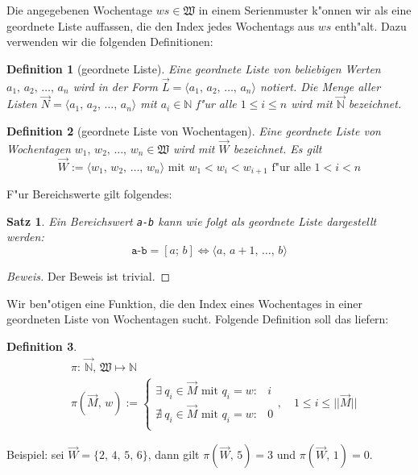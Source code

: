 \documentclass[a4paper]{article}
\newcommand*{\wkdays}{\mathfrak{W}}
\numberwithin{equation}{section}
\newtheorem{dfn}{Definition}
\newtheorem{thm}{Satz}
\begin{document}
\noindent Die angegebenen Wochentage $ws \in \wkdays$ in einem Serienmuster
k"onnen wir als eine geordnete Liste auf\mbox{}fassen, die den Index jedes
Wochentags aus $ws$ enth"alt. Dazu verwenden wir die folgenden Definitionen:
\begin{dfn}[geordnete Liste]
  Eine geordnete Liste von beliebigen Werten $a_1,\,a_2,\,\dots,\,a_n$ wird in
  der Form $\vec{L} = \langle a_1,\,a_2,\,\dots,\,a_n\rangle$ notiert. Die Menge
  aller Listen $\vec{N} = \langle a_1,\,a_2,\,\dots,\,a_n\rangle$ mit
  $a_i \in \mathbb{N}$ f"ur alle $1 \le i \le n$ wird mit $\vec{\mathbb{N}}$
  bezeichnet.
\end{dfn}
\begin{dfn}[geordnete Liste von Wochentagen]
  Eine geordnete Liste von Wochentagen $w_1,\,w_2,\,\ldots,\,w_n \in \wkdays$
  wird mit $\vec{W}$ bezeichnet. Es gilt
  \begin{equation}
    \vec{W} := \langle w_1,\,w_2,\,\dots,\,w_n\rangle\textrm{ mit }
    w_1 < w_i < w_{i+1} \textrm{ f"ur alle } 1 < i < n
  \end{equation}
\end{dfn}

\noindent F"ur Bereichswerte gilt folgendes:
\begin{thm}\label{thm:range}
  Ein Bereichswert \texttt{a-b} kann wie folgt als geordnete Liste dargestellt
  werden:
  \begin{equation}
    \texttt{a-b} = [a;\,b] \iff \langle a,\,a+1,\,\dots,\,b\rangle
  \end{equation}
\end{thm}
\begin{proof}[Beweis]Der Beweis ist trivial.\end{proof}

\noindent Wir ben"otigen eine Funktion, die den Index eines Wochentages in einer
geordneten Liste von Wochentagen sucht. Folgende Definition soll das
liefern:
\begin{dfn}
  \begin{equation}
  \begin{split}
    & \pi :\ \vec{\mathbb{N}},\,\wkdays \mapsto \mathbb{N} \\
    & \pi(\vec{M},\,w) := \left\{\begin{array}{ll}
    \exists\ q_i \in \vec{M} \textrm{ mit } q_i = w : & i \\
    \nexists\ q_i \in \vec{M} \textrm{ mit } q_i = w : & 0 \\
    \end{array}\right.,\quad
    1 \le i \le ||\vec{M}||
  \end{split}
  \end{equation}
\end{dfn}
\noindent Beispiel: sei $\vec{W} = \{2,\,4,\,5,\,6\}$, dann gilt
$\pi(\vec{W},\,5) = 3$ und $\pi(\vec{W},\,1) = 0$.
\end{document}
